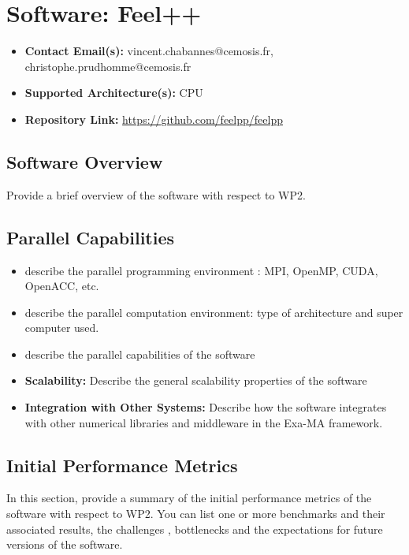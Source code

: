 \section{Software: Feel++}
\label{sec:WP2:Feel++:software}

\begin{itemize}
    \item \textbf{Contact Email(s):} vincent.chabannes@cemosis.fr, christophe.prudhomme@cemosis.fr
    \item \textbf{Supported Architecture(s):} CPU
    \item \textbf{Repository Link:} \href{https://github.com/feelpp/feelpp}{https://github.com/feelpp/feelpp}
\end{itemize}

\subsection{Software Overview}
\label{sec:WP2:Feel++:summary}

Provide a brief overview of the software with respect to WP2.

\subsection{Parallel Capabilities}
\label{sec:WP2:Feel++:performances}


\begin{itemize}
    \item describe the parallel programming  environment : MPI, OpenMP, CUDA, OpenACC, etc.
    \item describe the parallel computation environment: type of architecture and super computer used.
    \item describe the parallel capabilities of the software
    \item \textbf{Scalability:} Describe the general scalability properties of the software
    \item \textbf{Integration with Other Systems:} Describe how the software integrates with other numerical libraries and middleware in the Exa-MA framework.
\end{itemize}

\subsection{Initial Performance Metrics}
\label{sec:WP2:Feel++:metrics}

In this section, provide a summary of the initial performance metrics of the software with respect to WP2.
You can list one or more benchmarks and their associated results, the challenges , bottlenecks and the expectations for future versions of the software.



